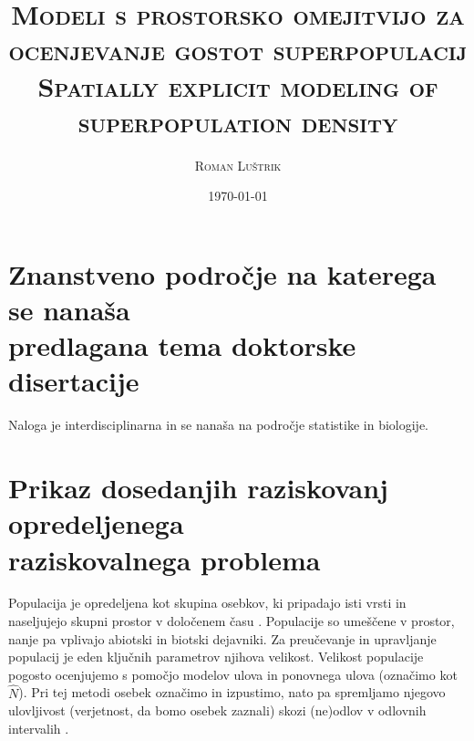 \documentclass[a4paper]{article}
\title{
\textsc{
Modeli s prostorsko omejitvijo za ocenjevanje gostot superpopulacij \\
\vspace{0.3cm}
Spatially explicit modeling of superpopulation density
}}
\author{\textsc{Roman Luštrik}}
\date{\today}
\begin{document}
\maketitle
\tableofcontents

\section{Znanstveno področje na katerega se nanaša \\ predlagana tema doktorske disertacije}

Naloga je interdisciplinarna in se nanaša na področje statistike in biologije.

\section{Prikaz dosedanjih raziskovanj opredeljenega \\ raziskovalnega problema}


Populacija je opredeljena kot skupina osebkov, ki pripadajo isti vrsti in naseljujejo skupni prostor v določenem času \citep{krebs2001}. Populacije so umeščene v prostor, nanje pa vplivajo abiotski in biotski dejavniki. Za preučevanje in upravljanje populacij je eden ključnih parametrov njihova velikost. Velikost populacije pogosto ocenjujemo s pomočjo modelov ulova in ponovnega ulova (označimo kot $\hat{N}$). Pri tej metodi osebek označimo in izpustimo, nato pa spremljamo njegovo ulovljivost (verjetnost, da bomo osebek zaznali) skozi (ne)odlov v odlovnih intervalih \citep{williams2002}.
 
\end{document}
